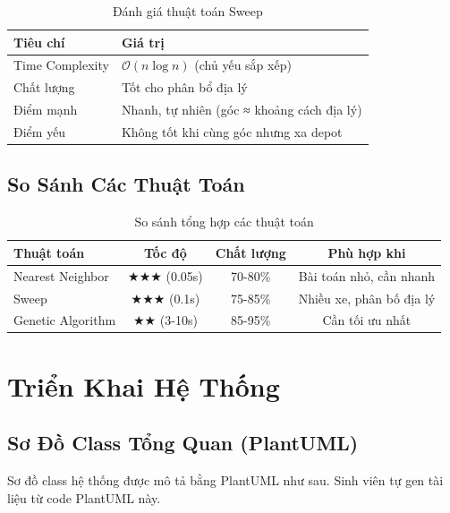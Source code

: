 \documentclass[12pt,a4paper,openany,oneside]{report}
\newcommand{\bigO}{\mathcal{O}}
\begin{document}
\begin{table}[h]
\centering
\caption{Đánh giá thuật toán Sweep}
\begin{tabular}{@{}ll@{}}
\toprule
\textbf{Tiêu chí} & \textbf{Giá trị} \\
\midrule
Time Complexity & $\bigO(n \log n)$ (chủ yếu sắp xếp) \\
Chất lượng & Tốt cho phân bổ địa lý \\
Điểm mạnh & Nhanh, tự nhiên (góc ≈ khoảng cách địa lý) \\
Điểm yếu & Không tốt khi cùng góc nhưng xa depot \\
\bottomrule
\end{tabular}
\end{table}

\section{So Sánh Các Thuật Toán}

\begin{table}[h]
\centering
\caption{So sánh tổng hợp các thuật toán}
\begin{tabular}{@{}lccc@{}}
\toprule
\textbf{Thuật toán} & \textbf{Tốc độ} & \textbf{Chất lượng} & \textbf{Phù hợp khi} \\
\midrule
Nearest Neighbor & $\bigstar\bigstar\bigstar$ (0.05s) & 70-80\% & Bài toán nhỏ, cần nhanh \\
Sweep & $\bigstar\bigstar\bigstar$ (0.1s) & 75-85\% & Nhiều xe, phân bố địa lý \\
Genetic Algorithm & $\bigstar\bigstar$ (3-10s) & 85-95\% & Cần tối ưu nhất \\
\bottomrule
\end{tabular}
\end{table}

\chapter{Triển Khai Hệ Thống}

\section{Sơ Đồ Class Tổng Quan (PlantUML)}

Sơ đồ class hệ thống được mô tả bằng PlantUML như sau. Sinh viên tự gen tài liệu từ code PlantUML này.
\end{document}
